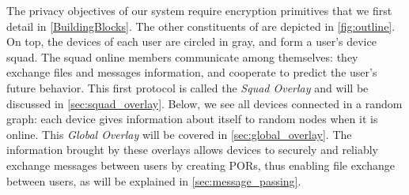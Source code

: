 The privacy objectives of our system require encryption primitives that we 
first detail in \cref{BuildingBlocks}. The other constituents of \name are 
depicted in \cref{fig:outline}.
On top, the devices of each user are circled in gray, and form a user's device squad. The squad online members communicate among themselves: they exchange files and messages information, and cooperate to predict the user's future behavior. 
This first protocol is called the \emph{Squad Overlay} and will be discussed in 
\cref{sec:squad_overlay}.
Below, we see all devices connected in a random graph: each device gives 
information about itself to random nodes when it is online. This \emph{Global 
  Overlay} will be covered in \cref{sec:global_overlay}.
The information brought by these overlays allows devices to securely and 
reliably exchange messages between users by creating PORs, thus enabling file 
exchange between users, as will be explained in \cref{sec:message_passing}.





%

